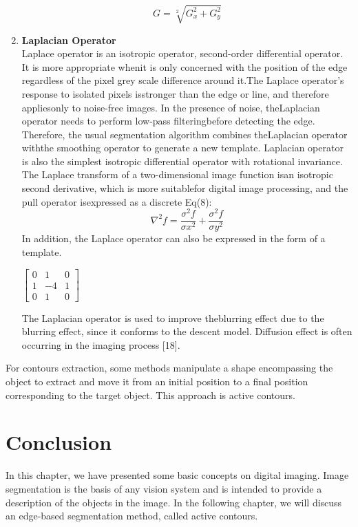 \begin{enumerate}{}
                        \begin{equation}
                                G = \sqrt[2]{G^{2}_{x} + G^{2}_{y}}
                        \end{equation}
                \item \textbf{Laplacian Operator} \\
                Laplace operator is an isotropic operator, second-order differential operator.
                It is more appropriate whenit is only concerned with the position of the edge regardless of
                the pixel grey scale difference around it.The Laplace operator's response to isolated pixels
                isstronger than the edge or line, and therefore appliesonly to noise-free images.
                In the presence of noise, theLaplacian operator needs to perform low-pass filteringbefore
                detecting the edge. Therefore, the usual segmentation algorithm combines theLaplacian operator
                withthe smoothing operator to generate a new template.
                Laplacian operator is also the simplest isotropic differential operator with rotational invariance.
                The Laplace transform of a two-dimensional image function isan isotropic second derivative,
                which is more suitablefor digital image processing, and the pull operator isexpressed as a discrete Eq(8):
                        \begin{equation}
                                \nabla^{2} f = \frac{\sigma^2 f}{\sigma x^2 } + \frac{\sigma^2 f}{\sigma y^2 }
                        \end{equation}
                In addition, the Laplace operator can also be expressed in the form of a template.
               \begin{center}
                       $
                       \begin{bmatrix}
                               0 & 1 & 0 \\
                               1 & -4 & 1 \\
                               0 & 1 & 0
                       \end{bmatrix}
                       $
               \end{center}
                The Laplacian operator is used to improve theblurring effect due to the blurring effect,
                since it conforms to the descent model. Diffusion effect is often occurring in the imaging process [18].
        \end{enumerate}
For contours extraction, some methods manipulate a shape encompassing the object to extract and move it from an initial
position to a final position corresponding to the target object. This approach is active contours.
\section{Conclusion}
In this chapter, we have presented some basic concepts on digital imaging.
Image segmentation is the basis of any vision system and is intended to provide a description of the objects in the image.
In the following chapter, we will discuss an edge-based segmentation method, called active contours.